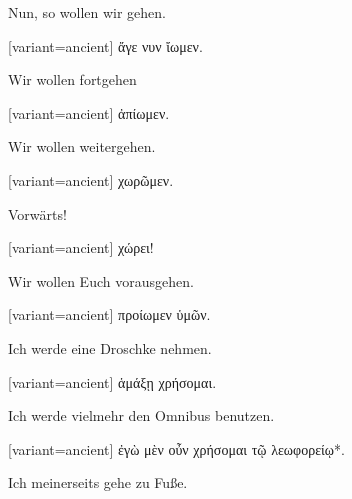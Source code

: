 Nun, so wollen wir gehen.

\switchcolumn

\begin{greek}[variant=ancient]%
ἄγε νυν ἴωμεν.

\end{greek}%
\switchcolumn*

Wir wollen fortgehen

\switchcolumn

\begin{greek}[variant=ancient]%
ἀπίωμεν.

\end{greek}%
\switchcolumn*

Wir wollen weitergehen.

\switchcolumn

\begin{greek}[variant=ancient]%
χωρῶμεν.

\end{greek}%
\switchcolumn*

Vorwärts!

\switchcolumn

\begin{greek}[variant=ancient]%
χώρει!

\end{greek}%
\switchcolumn*

Wir wollen Euch voraus\textcompwordmark{}gehen.

\switchcolumn

\begin{greek}[variant=ancient]%
προίωμεν ὑμῶν.

\end{greek}%
\switchcolumn*

Ich werde eine Droschke nehmen.

\switchcolumn

\begin{greek}[variant=ancient]%
ἁμάξῃ χρήσομαι.

\end{greek}%
\switchcolumn*

Ich werde vielmehr den Omnibus benutzen.

\switchcolumn

\begin{greek}[variant=ancient]%
ἐγὼ μὲν οὖν χρήσομαι τῷ λεωφορείῳ{*}.

\end{greek}%
\switchcolumn*

Ich meinerseits gehe zu Fuße.

